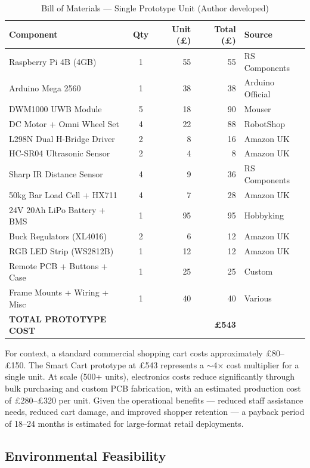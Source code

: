\begin{table}[!ht]
\caption{Bill of Materials --- Single Prototype Unit (Author developed)}
\label{tab:bom}
\centering
\footnotesize
\begin{tabular}{p{2.5cm} c r r p{1.3cm}}
\toprule
\textbf{Component} & \textbf{Qty} & \textbf{Unit (£)} & \textbf{Total (£)} & \textbf{Source} \\
\midrule
Raspberry Pi 4B (4GB) & 1 & 55 & 55 & RS Components \\
Arduino Mega 2560 & 1 & 38 & 38 & Arduino Official \\
DWM1000 UWB Module & 5 & 18 & 90 & Mouser \\
DC Motor + Omni Wheel Set & 4 & 22 & 88 & RobotShop \\
L298N Dual H-Bridge Driver & 2 & 8 & 16 & Amazon UK \\
HC-SR04 Ultrasonic Sensor & 2 & 4 & 8 & Amazon UK \\
Sharp IR Distance Sensor & 4 & 9 & 36 & RS Components \\
50kg Bar Load Cell + HX711 & 4 & 7 & 28 & Amazon UK \\
24V 20Ah LiPo Battery + BMS & 1 & 95 & 95 & Hobbyking \\
Buck Regulators (XL4016) & 2 & 6 & 12 & Amazon UK \\
RGB LED Strip (WS2812B) & 1 & 12 & 12 & Amazon UK \\
Remote PCB + Buttons + Case & 1 & 25 & 25 & Custom \\
Frame Mounts + Wiring + Misc & 1 & 40 & 40 & Various \\
\midrule
\textbf{TOTAL PROTOTYPE COST} & & & \textbf{£543} & \\
\bottomrule
\end{tabular}
\end{table}

For context, a standard commercial shopping cart costs approximately
£80--£150. The Smart Cart prototype at £543 represents a $\sim$4$\times$
cost multiplier for a single unit. At scale (500+ units), electronics
costs reduce significantly through bulk purchasing and custom PCB
fabrication, with an estimated production cost of £280--£320 per unit.
Given the operational benefits --- reduced staff assistance needs, reduced
cart damage, and improved shopper retention --- a payback period of 18--24
months is estimated for large-format retail deployments.

\subsection{Environmental Feasibility}

